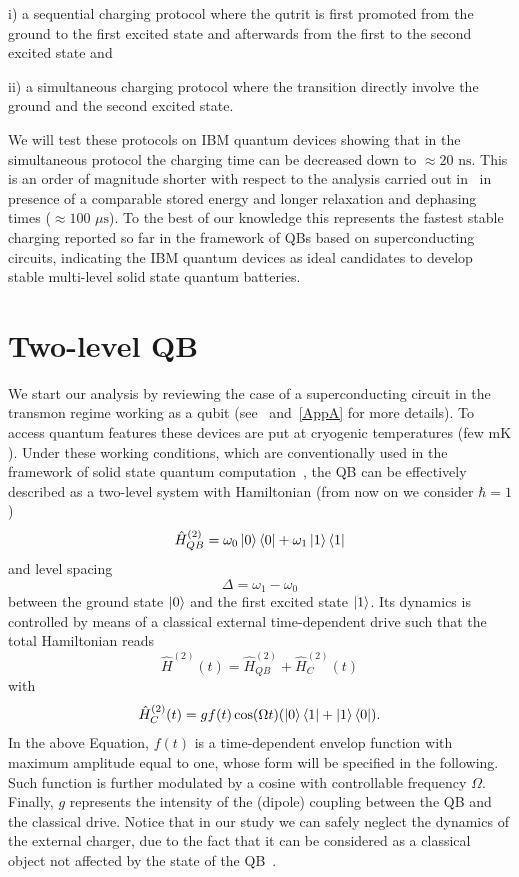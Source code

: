 \documentclass[12pt]{iopart}
\begin{document}
i) a sequential charging protocol where the qutrit is first promoted from the ground to the first excited state and afterwards from the first to the second excited state and 

ii) a simultaneous charging protocol where the transition directly involve the ground and the second excited state. 


We will test these protocols on IBM quantum devices showing that in the simultaneous protocol the charging time can be decreased down to $\approx 20\,\,\mathrm{ns}$. %
This is an order of magnitude shorter with respect to the analysis carried out in~\cite{Hu22, Gemme22} in presence of a comparable stored energy and longer relaxation and dephasing times ($\approx 100\,\,\mu\mathrm{s}$). To the best of our knowledge this represents the fastest stable charging reported so far in the framework of QBs based on superconducting circuits, indicating the IBM quantum devices as ideal candidates to develop stable multi-level solid state quantum batteries. 

\section{Two-level QB}
\label{sec:qubit}
We start our analysis by reviewing the case of a superconducting circuit in the transmon regime 
working as a qubit (see~\cite{Koch07} and~\ref{AppA} for more details). To access quantum features these devices are put at cryogenic temperatures (few $\mathrm{mK}$). Under these working conditions, which are conventionally used in the framework of solid state quantum computation~\cite{Krantz19}, the QB can be effectively described as a two-level system with Hamiltonian (from now on we consider $\hbar=1$)
\begin{equation}
\hat{H}_{QB}^{(2)}=\omega_0\ket{0}\bra{0}+\omega_1\ket{1}\bra{1}
\end{equation}
and level spacing 
\begin{equation}
\Delta=\omega_1-\omega_0
\end{equation}
between the ground state $\ket{0}$ and the first excited state $\ket{1}$. Its dynamics is controlled by means of a classical external time-dependent drive such that the total Hamiltonian reads~\cite{Alexander20, Smith22} 
\begin{equation}
\hat{H}^{(2)}(t)=\hat{H}_{QB}^{(2)}+\hat{H}_C^{(2)}(t)   
\end{equation} 
with
\begin{equation}
\hat{H}_C^{(2)}(t)=gf(t)\cos(\Omega t)(\ket{0}\bra{1}+\ket{1}\bra{0}).
\end{equation}
In the above Equation, $f(t)$ is a time-dependent envelop function with maximum amplitude equal to one, whose form will be specified in the following. Such function is further modulated by a cosine with controllable frequency $\Omega$. Finally, $g$ represents the intensity of the (dipole) coupling between the QB and the classical drive. Notice that in our study we can safely neglect the dynamics of the external charger, due to the fact that it can be considered as a classical object not affected by the state of the QB~\cite{Crescente20}.
\end{document}
